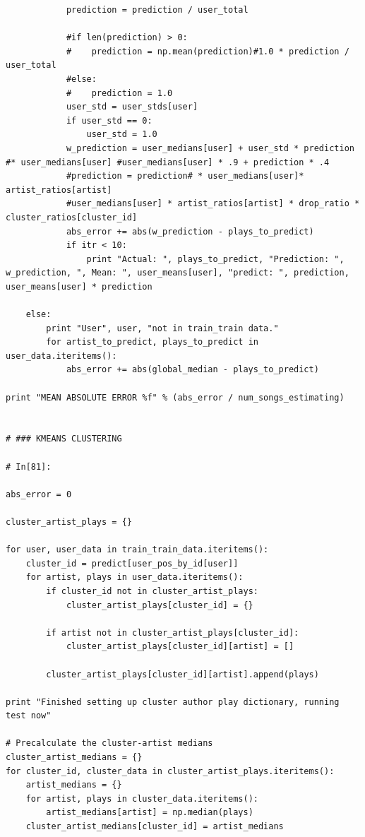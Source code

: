 \documentclass[11pt]{article}
\begin{document}
\begin{lstlisting}
            prediction = prediction / user_total
        
            #if len(prediction) > 0:
            #    prediction = np.mean(prediction)#1.0 * prediction / user_total
            #else:
            #    prediction = 1.0
            user_std = user_stds[user]
            if user_std == 0:
                user_std = 1.0
            w_prediction = user_medians[user] + user_std * prediction #* user_medians[user] #user_medians[user] * .9 + prediction * .4
            #prediction = prediction# * user_medians[user]* artist_ratios[artist]
            #user_medians[user] * artist_ratios[artist] * drop_ratio * cluster_ratios[cluster_id]
            abs_error += abs(w_prediction - plays_to_predict) 
            if itr < 10:
                print "Actual: ", plays_to_predict, "Prediction: ", w_prediction, ", Mean: ", user_means[user], "predict: ", prediction, user_means[user] * prediction

    else:
        print "User", user, "not in train_train data."
        for artist_to_predict, plays_to_predict in user_data.iteritems():
            abs_error += abs(global_median - plays_to_predict)
            
print "MEAN ABSOLUTE ERROR %f" % (abs_error / num_songs_estimating)


# ### KMEANS CLUSTERING

# In[81]:

abs_error = 0

cluster_artist_plays = {}

for user, user_data in train_train_data.iteritems():
    cluster_id = predict[user_pos_by_id[user]]
    for artist, plays in user_data.iteritems():
        if cluster_id not in cluster_artist_plays:
            cluster_artist_plays[cluster_id] = {}
        
        if artist not in cluster_artist_plays[cluster_id]:
            cluster_artist_plays[cluster_id][artist] = []
        
        cluster_artist_plays[cluster_id][artist].append(plays)

print "Finished setting up cluster author play dictionary, running test now"

# Precalculate the cluster-artist medians
cluster_artist_medians = {}
for cluster_id, cluster_data in cluster_artist_plays.iteritems():
    artist_medians = {}
    for artist, plays in cluster_data.iteritems():
        artist_medians[artist] = np.median(plays)
    cluster_artist_medians[cluster_id] = artist_medians


\end{lstlisting}
\end{document}
